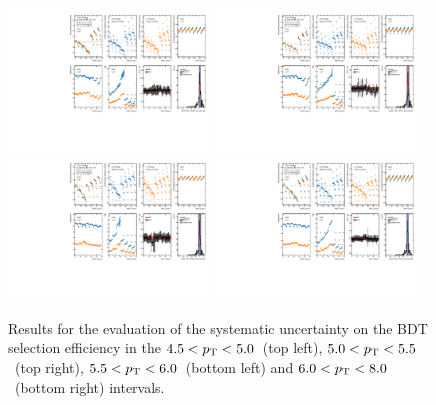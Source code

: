 \begin{figure}
    \centering
    \includegraphics[width=0.48\textwidth]{Figures/Chapter 6/AllSystBDT/BDTsyst8.pdf}
    \includegraphics[width=0.48\textwidth]{Figures/Chapter 6/AllSystBDT/BDTsyst9.pdf}
    \includegraphics[width=0.48\textwidth]{Figures/Chapter 6/AllSystBDT/BDTsyst10.pdf}
    \includegraphics[width=0.48\textwidth]{Figures/Chapter 6/AllSystBDT/BDTsyst11.pdf}
    \caption{Results for the evaluation of the systematic uncertainty on the BDT selection efficiency in the $4.5 < p_\mathrm{T} < 5.0$~\gevc (top left), $5.0 < p_\mathrm{T} < 5.5$~\gevc (top right), $5.5 < p_\mathrm{T} < 6.0$~\gevc (bottom left) and $6.0 < p_\mathrm{T} < 8.0$~\gevc (bottom right) intervals.}
\end{figure}

